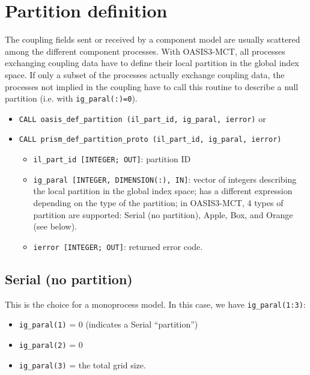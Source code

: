 \section{Partition definition}
\label{subsubsec_Partition}


The coupling fields sent or received by a component model are usually
scattered among the different component processes. With OASIS3-MCT,
all processes exchanging coupling data have to define their local
partition in the global index space. If only a subset of the processes
actually exchange coupling data, the processes not implied in the
coupling have to call this routine to describe a null partition (i.e. with {\tt ig\_paral(:)=0}).

\begin{itemize}

\vspace{0.2cm}
\item {\tt CALL oasis\_def\_partition        (il\_part\_id, ig\_paral, ierror)}
 or 
\item {\tt CALL prism\_def\_partition\_proto (il\_part\_id, ig\_paral, ierror)}

   \begin{itemize}
   \item {\tt il\_part\_id [INTEGER; OUT]}: partition ID 
   \item {\tt ig\_paral [INTEGER, DIMENSION(:), IN]}: vector of
   integers describing the local partition in the global index space; has a different expression depending on the type of the
partition; in OASIS3-MCT, 4 types of partition are supported: Serial (no
partition), Apple, Box, and Orange (see below).
   \item {\tt ierror [INTEGER; OUT]}: returned error code.
   \end{itemize}
\end{itemize} 

\subsection{Serial (no partition)}

This is the choice for a monoprocess model. In this case, we have 
{\tt ig\_paral(1:3)}:
\begin{itemize}
 \item {\tt ig\_paral(1)} = 0 (indicates a Serial ``partition'')
 \item {\tt ig\_paral(2)} = 0
 \item {\tt ig\_paral(3)} = the total grid size.
\end{itemize}

